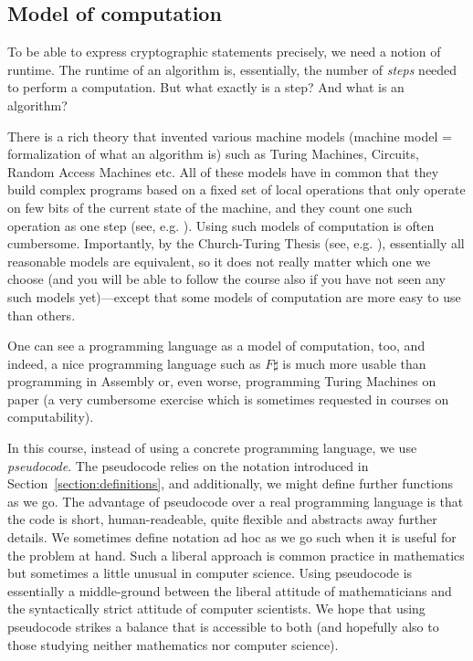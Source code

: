 \subsection{Model of computation}\label{ssec:model-of-computation}
To be able to express cryptographic statements precisely, we need a notion of runtime. The runtime of an algorithm is, essentially, the number of \emph{steps} needed to perform a computation. But what exactly is a step? And what is an algorithm? 

There is a rich theory that invented various machine models (machine model = formalization of what an algorithm is) such as Turing Machines, Circuits, Random Access Machines etc. All of these models have in common that they build complex programs based on a fixed set of local operations that only operate on few bits of the current state of the machine, and they count one such operation as one step (see, e.g. \cite[Chapters 1.2.2 and 1.2.3]{goldreichcomplexity}). Using such models of computation is often cumbersome. Importantly, by the Church-Turing Thesis (see, e.g. \cite[Chapter 1.2.3]{goldreichcomplexity}), essentially all reasonable models are equivalent, so it does not really matter which one we choose (and you will be able to follow the course also if you have not seen any such models yet)---except that some models of computation are more easy to use than others.

One can see a programming language as a model of computation, too, and indeed, a nice programming language such as $F\sharp$ is much more usable than programming in Assembly or, even worse, programming Turing Machines on paper (a very cumbersome exercise which is sometimes requested in courses on computability).

In this course, instead of using a concrete programming language, we use \emph{pseudocode}. The pseudocode relies on the notation introduced in Section~\ref{section:definitions}, and additionally, we might define further functions as we go. The advantage of pseudocode over a real programming language is that the code is short, human-readeable, quite flexible and abstracts away further details. We sometimes define notation ad hoc as we go such when it is useful for the problem at hand. Such a liberal approach is common practice in mathematics but sometimes a little unusual in computer science. Using pseudocode is essentially a middle-ground between the liberal attitude of mathematicians and the syntactically strict attitude of computer scientists. We hope that using pseudocode strikes a balance that is accessible to both (and hopefully also to those studying neither mathematics nor computer science). 


